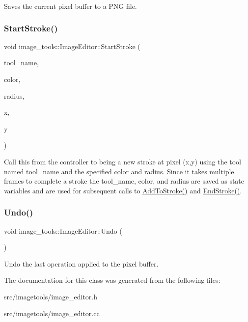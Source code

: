 Saves the current pixel buffer to a P\+NG file. \mbox{\label{classimage__tools_1_1ImageEditor_a396d6b86c6d740714f4311737a40e19c}} 
\subsubsection{\texorpdfstring{Start\+Stroke()}{StartStroke()}}
{\footnotesize\ttfamily void image\+\_\+tools\+::\+Image\+Editor\+::\+Start\+Stroke (\begin{DoxyParamCaption}\item[{const std\+::string \&}]{tool\+\_\+name,  }\item[{const \hyperlink{classimage__tools_1_1ColorData}{Color\+Data} \&}]{color,  }\item[{float}]{radius,  }\item[{int}]{x,  }\item[{int}]{y }\end{DoxyParamCaption})}

Call this from the controller to being a new stroke at pixel (x,y) using the tool named tool\+\_\+name and the specified color and radius. Since it takes multiple frames to complete a stroke the tool\+\_\+name, color, and radius are saved as state variables and are used for subsequent calls to \hyperlink{classimage__tools_1_1ImageEditor_ab3e3fdaa5a72bfb4a8004bd151c97921}{Add\+To\+Stroke()} and \hyperlink{classimage__tools_1_1ImageEditor_a14b562aac1107fec7f28a53fe44f2550}{End\+Stroke()}. \mbox{\label{classimage__tools_1_1ImageEditor_a68b451ce2df352889281e5b4afd6df19}} 
\subsubsection{\texorpdfstring{Undo()}{Undo()}}
{\footnotesize\ttfamily void image\+\_\+tools\+::\+Image\+Editor\+::\+Undo (\begin{DoxyParamCaption}{ }\end{DoxyParamCaption})}

Undo the last operation applied to the pixel buffer. 

The documentation for this class was generated from the following files\+:\begin{DoxyCompactItemize}
\item 
src/imagetools/image\+\_\+editor.\+h\item 
src/imagetools/image\+\_\+editor.\+cc\end{DoxyCompactItemize}
